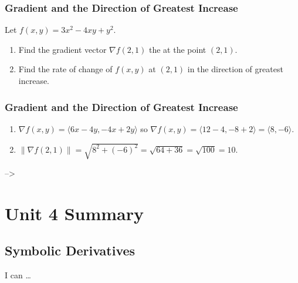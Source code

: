 \documentclass[
]{book}
\providecommand{\tightlist}{%
  \setlength{\itemsep}{0pt}\setlength{\parskip}{0pt}}
\begin{document}
\hypertarget{gradient-and-the-direction-of-greatest-increase}{%
\subsection{Gradient and the Direction of Greatest Increase}\label{gradient-and-the-direction-of-greatest-increase}}

Let \(f(x,y) = 3x^2 - 4xy + y^2\).

\begin{enumerate}
\def\labelenumi{\arabic{enumi}.}
\tightlist
\item
  Find the gradient vector \(\nabla f(2,1)\) the at the point \((2,1)\).
\item
  Find the rate of change of \(f(x,y)\) at \((2,1)\) in the direction of greatest increase.
\end{enumerate}

\hypertarget{gradient-and-the-direction-of-greatest-increase-1}{%
\subsection{Gradient and the Direction of Greatest Increase}\label{gradient-and-the-direction-of-greatest-increase-1}}

\begin{enumerate}
\def\labelenumi{\arabic{enumi}.}
\tightlist
\item
  \(\nabla f(x,y) = \langle 6x - 4y, -4x + 2y \rangle\) so
  \(\nabla f(x,y) = \langle 12 - 4, -8 + 2 \rangle = \langle 8, -6 \rangle\).
\item
  \(\| \nabla f(2,1) \| = \sqrt{8^2 + (-6)^2} = \sqrt{64+36} = \sqrt{100} = 10.\)
\end{enumerate}

--\textgreater{}

\hypertarget{unit-4-summary}{%
\chapter{Unit 4 Summary}\label{unit-4-summary}}

\hypertarget{symbolic-derivatives}{%
\section{Symbolic Derivatives}\label{symbolic-derivatives}}

I can \ldots{}
\end{document}
